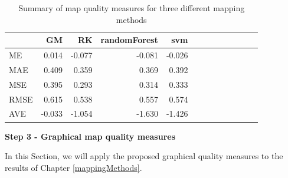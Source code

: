 \documentclass[10pt,b5paper,]{book}
\newenvironment{Shaded}{\begin{snugshade}}{\end{snugshade}}
\newcommand{\DataTypeTok}[1]{\textcolor[rgb]{0.13,0.29,0.53}{#1}}
\newcommand{\DecValTok}[1]{\textcolor[rgb]{0.00,0.00,0.81}{#1}}
\newcommand{\KeywordTok}[1]{\textcolor[rgb]{0.13,0.29,0.53}{\textbf{#1}}}
\newcommand{\NormalTok}[1]{#1}
\newcommand{\OperatorTok}[1]{\textcolor[rgb]{0.81,0.36,0.00}{\textbf{#1}}}
\newcommand{\OtherTok}[1]{\textcolor[rgb]{0.56,0.35,0.01}{#1}}
\newcommand{\StringTok}[1]{\textcolor[rgb]{0.31,0.60,0.02}{#1}}
\theoremstyle{definition}
\theoremstyle{definition}
\theoremstyle{definition}
\theoremstyle{remark}
\begin{document}
\begin{Shaded}
\end{Shaded}

\begin{table}

\caption{\label{tab:unnamed-chunk-85}Summary of map quality measures for three different mapping methods}
\centering
\begin{tabular}[t]{lrrrrrrrrrrrr}
\toprule
  & GM & RK & randomForest & svm\\
\midrule
ME & 0.014 & -0.077 & -0.081 & -0.026\\
MAE & 0.409 & 0.359 & 0.369 & 0.392\\
MSE & 0.395 & 0.293 & 0.314 & 0.333\\
RMSE & 0.615 & 0.538 & 0.557 & 0.574\\
AVE & -0.033 & -1.054 & -1.630 & -1.426\\
\bottomrule
\end{tabular}
\end{table}

\textbf{Step 3 - Graphical map quality measures}

In this Section, we will apply the proposed graphical quality measures
to the results of Chapter \ref{mappingMethods}.
\end{document}
